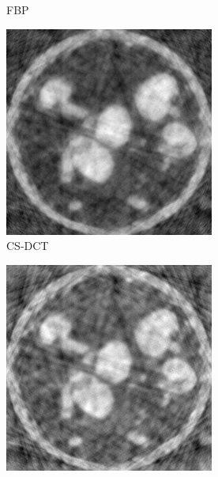 \documentclass{article}
\begin{document}
\begin{figure}[h]
\begin{subfigure}[b]{0.3\linewidth}
        \caption{FBP}
    \end{subfigure}
    \begin{subfigure}[b]{0.3\linewidth}
        \includegraphics[width=\textwidth]{../images/supplementary/2D_sprouts/19_angles/1/cs_dct.png}
        \caption{CS-DCT}
     \end{subfigure}
    \begin{subfigure}[b]{0.3\linewidth}
        \includegraphics[width=\textwidth]{../images/supplementary/2D_sprouts/19_angles/1/cs_wavelet.png}

\end{subfigure}
\end{figure}
\end{document}
